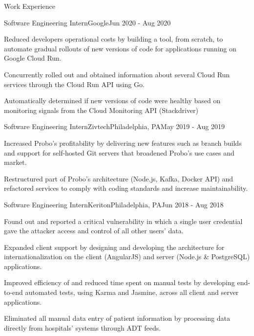 \documentclass{resume} %
\begin{document}
\begin{rSection}{Work Experience}

\begin{rSubsection}{Software Engineering Intern}{Google}{}{Jun 2020 - Aug 2020}
\item Reduced developers operational costs by building a tool, from scratch, to automate gradual rollouts of new versions of code for applications running on Google Cloud Run.
\item Concurrently rolled out and obtained information about several Cloud Run services through the Cloud Run API using Go.
\item Automatically determined if new versions of code were healthy based on monitoring signals from the Cloud Monitoring API (Stackdriver)
\end{rSubsection}


\begin{rSubsection}{Software Engineering Intern}{Zivtech}{Philadelphia, PA}{May 2019 - Aug 2019}
\item Increased Probo's profitability by delivering new features such as branch builds and support for self-hosted Git servers that broadened Probo's use cases and market.
\item Restructured part of Probo's architecture (Node.js, Kafka, Docker API) and refactored services to comply with coding standards and increase maintainability.
\end{rSubsection}


\begin{rSubsection}{Software Engineering Intern}{Keriton}{Philadelphia, PA}{Jun 2018 - Aug 2018}
\item Found out and reported a critical vulnerability in which a single user credential gave the attacker access and control of all other users' data.
\item Expanded client support by designing and developing the architecture for internationalization on the client (AngularJS) and server (Node.js \& PostgreSQL) applications.
\item Improved efficiency of and reduced time spent on manual tests by developing end-to-end automated tests, using Karma and Jasmine, across all client and server applications.
\item Eliminated all manual data entry of patient information by processing data directly from hospitals' systems through ADT feeds.
\end{rSubsection}

\end{rSection}
\end{document}

